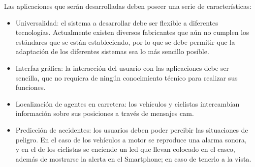 Las aplicaciones que serán desarrolladas deben poseer una serie de características:
\begin{itemize}
	\item Universalidad: el sistema a desarrollar debe ser flexible a diferentes tecnologías. Actualmente existen diversos fabricantes que aún no cumplen los estándares que se están estableciendo, por lo que se debe permitir que la adaptación de los diferentes sistemas sea lo más sencillo posible.
	
	\item Interfaz gráfica: la interacción del usuario con las aplicaciones debe ser sencilla, que no requiera de ningún conocimiento técnico para realizar sus funciones.
	
	\item Localización de agentes en carretera: los vehículos y ciclistas intercambian información sobre sus posiciones a través de mensajes \gls{cam}.
	
	\item Predicción de accidentes: los usuarios deben poder percibir las situaciones de peligro. En el caso de los vehículos a motor se reproduce una alarma sonora, y en el de los ciclistas se enciende un led que llevan colocado en el casco, además de mostrarse la alerta en el Smartphone; en caso de tenerlo a la vista.
\end{itemize}
